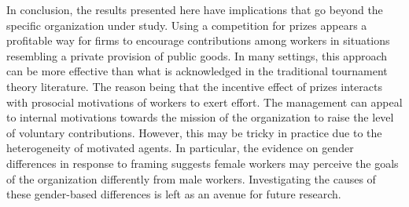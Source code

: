 \documentclass[11pt, titlepage]{article}
\begin{document}
In conclusion, the results presented here have implications that go
beyond the specific organization under study. Using a competition for
prizes appears a profitable way for firms to encourage contributions
among workers in situations resembling a private provision of public
goods. In many settings, this approach can be more effective than what
is acknowledged in the traditional tournament theory literature. The
reason being that the incentive effect of prizes interacts with
prosocial motivations of workers to exert effort. The management can
appeal to internal motivations towards the mission of the organization
to raise the level of voluntary contributions. However, this may be
tricky in practice due to the heterogeneity of motivated agents. In
particular, the evidence on gender differences in response to framing
suggests female workers may perceive the goals of the organization
differently from male workers. Investigating the causes of these
gender-based differences is left as an avenue for future research.

\renewcommand\refname{References}

\end{document}
